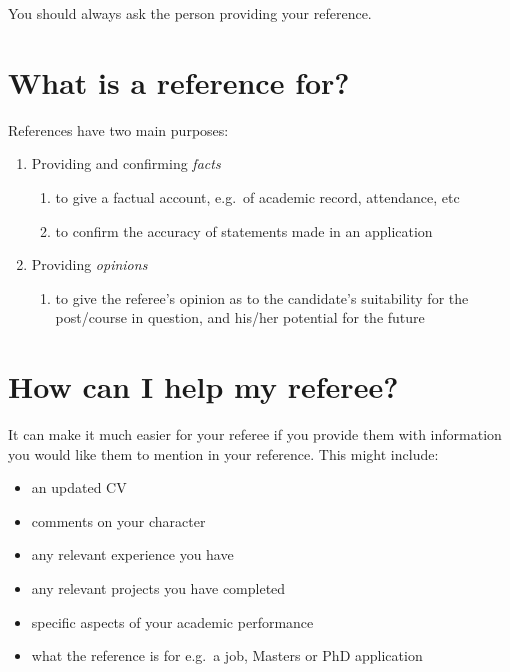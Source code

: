 \documentclass[
  12pt,
]{book}
\providecommand{\tightlist}{%
  \setlength{\itemsep}{0pt}\setlength{\parskip}{0pt}}
\begin{document}
You should always ask the person providing your reference.

\hypertarget{what-is-a-reference-for}{%
\section{What is a reference for?}\label{what-is-a-reference-for}}

References have two main purposes:

\begin{enumerate}
\def\labelenumi{\arabic{enumi}.}
\tightlist
\item
  Providing and confirming \emph{facts}

  \begin{enumerate}
  \def\labelenumii{\roman{enumii}.}
  \tightlist
  \item
    to give a factual account, e.g.~of academic record, attendance, etc
  \item
    to confirm the accuracy of statements made in an application
  \end{enumerate}
\item
  Providing \emph{opinions}

  \begin{enumerate}
  \def\labelenumii{\roman{enumii}.}
  \tightlist
  \item
    to give the referee's opinion as to the candidate's suitability for the post/course in
    question, and his/her potential for the future
  \end{enumerate}
\end{enumerate}

\hypertarget{how-can-i-help-my-referee}{%
\section{How can I help my referee?}\label{how-can-i-help-my-referee}}

It can make it much easier for your referee if you provide them with information you would like them to mention in your reference. This might include:

\begin{itemize}
\tightlist
\item
  an updated CV\\
\item
  comments on your character
\item
  any relevant experience you have
\item
  any relevant projects you have completed
\item
  specific aspects of your academic performance
\item
  what the reference is for e.g.~a job, Masters or PhD application
\end{itemize}
\end{document}
